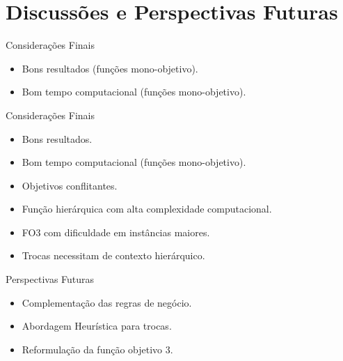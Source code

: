 \section{Discussões e Perspectivas Futuras}

\begin{frame}{Considerações Finais}
   
    \begin{block}{}
    \begin{itemize}
        \item Bons resultados (funções mono-objetivo).
        \item Bom tempo computacional (funções mono-objetivo).
    \end{itemize}
    \end{block}
    \vspace{2.5cm}
    
\end{frame}

\begin{frame}{Considerações Finais}

   
    \begin{block}{}
    \begin{itemize}
        \item Bons resultados.
        \item Bom tempo computacional (funções mono-objetivo).
    \end{itemize}
    \end{block}

    \begingroup
    \begin{block}{}
        \begin{itemize}
            \item Objetivos conflitantes.
            \item Função hierárquica com alta complexidade computacional.
            \item FO3 com dificuldade em instâncias maiores.
            \item Trocas necessitam de contexto hierárquico.
        \end{itemize}
    \end{block}
    \endgroup
\end{frame}



\begin{frame}{Perspectivas Futuras}
    \begin{block}{}
        \begin{itemize}
            \item Complementação das regras de negócio.
            \item Abordagem Heurística para trocas.
            \item Reformulação da função objetivo 3.
        \end{itemize}
    \end{block}
\end{frame}